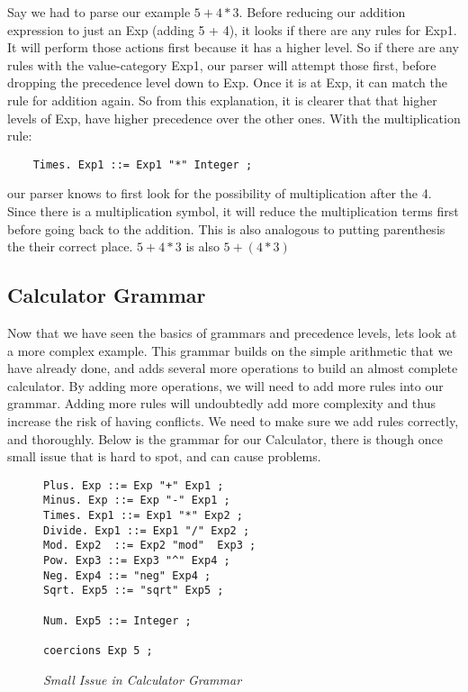 \documentclass{article}
\begin{document}
\noindent
Say we had to parse our example $5 + 4 * 3$. Before reducing our addition expression to just an Exp (adding 5 + 4), it looks if there are any rules for Exp1. It will perform those actions first because it has a higher level. So if there are any rules with the value-category Exp1, our parser will attempt those first, before dropping the precedence level down to Exp. Once it is at Exp, it can match the rule for addition again. So from this explanation, it is clearer that that higher levels of Exp, have higher precedence over the other ones. With the multiplication rule:
 \begin{lstlisting}
    Times. Exp1 ::= Exp1 "*" Integer ;
 \end{lstlisting}
 
 \noindent
 our parser knows to first look for the possibility of multiplication after the 4. Since there is a multiplication symbol, it will reduce the multiplication terms first before going back to the addition. This is also analogous to putting parenthesis the their correct place. $5 + 4 * 3$ is also $5 + (4 * 3)$
 
\subsection{Calculator Grammar}

\medskip\noindent
Now that we have seen the basics of grammars and precedence levels, lets look at a more complex example. This grammar builds on the simple arithmetic that we have already done, and adds several more operations to build an almost complete calculator. By adding more operations, we will need to add more rules into our grammar. Adding more rules will undoubtedly add more complexity and thus increase the risk of having conflicts. We need to make sure we add rules correctly, and thoroughly. Below is the grammar for our Calculator, there is though once small issue that is hard to spot, and can cause problems.

\begin{figure}[H]
    \begin{lstlisting}
Plus. Exp ::= Exp "+" Exp1 ;
Minus. Exp ::= Exp "-" Exp1 ;
Times. Exp1 ::= Exp1 "*" Exp2 ;
Divide. Exp1 ::= Exp1 "/" Exp2 ;
Mod. Exp2  ::= Exp2 "mod"  Exp3 ;
Pow. Exp3 ::= Exp3 "^" Exp4 ;
Neg. Exp4 ::= "neg" Exp4 ;
Sqrt. Exp5 ::= "sqrt" Exp5 ;

Num. Exp5 ::= Integer ;

coercions Exp 5 ;
    \end{lstlisting}
    \caption{\textit{Small Issue in Calculator Grammar}}
\end{figure}
\end{document}
